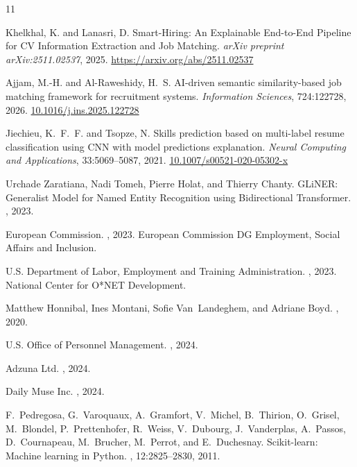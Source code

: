 \documentclass[12pt]{article}
\begin{document}

\begin{thebibliography}{11}

Khelkhal, K. and Lanasri, D.
\newblock Smart-Hiring: An Explainable End-to-End Pipeline for CV Information Extraction and Job Matching.
\newblock \textit{arXiv preprint arXiv:2511.02537}, 2025.
\newblock \url{https://arxiv.org/abs/2511.02537}

Ajjam, M.-H. and Al-Raweshidy, H.~S.
\newblock AI-driven semantic similarity-based job matching framework for recruitment systems.
\newblock \textit{Information Sciences}, 724:122728, 2026.
\newblock \url{10.1016/j.ins.2025.122728}

Jiechieu, K.~F.~F. and Tsopze, N.
\newblock Skills prediction based on multi-label resume classification using CNN with model predictions explanation.
\newblock \textit{Neural Computing and Applications}, 33:5069--5087, 2021.
\newblock \url{10.1007/s00521-020-05302-x}


Urchade Zaratiana, Nadi Tomeh, Pierre Holat, and Thierry Chanty.
\newblock GLiNER: Generalist Model for Named Entity Recognition using Bidirectional Transformer.
, 2023.

{European Commission}.
, 2023.
\newblock European Commission DG Employment, Social Affairs and Inclusion.

{U.S. Department of Labor, Employment and Training Administration}.
, 2023.
\newblock National Center for O*NET Development.

Matthew Honnibal, Ines Montani, Sofie Van~Landeghem, and Adriane Boyd.
, 2020.

{U.S. Office of Personnel Management}.
, 2024.

{Adzuna Ltd.}
, 2024.

{Daily Muse Inc.}
, 2024.

F.~Pedregosa, G.~Varoquaux, A.~Gramfort, V.~Michel, B.~Thirion, O.~Grisel, M.~Blondel, P.~Prettenhofer, R.~Weiss, V.~Dubourg, J.~Vanderplas, A.~Passos, D.~Cournapeau, M.~Brucher, M.~Perrot, and E.~Duchesnay.
\newblock Scikit-learn: Machine learning in {P}ython.
, 12:2825--2830, 2011.

\end{thebibliography}
\end{document}
